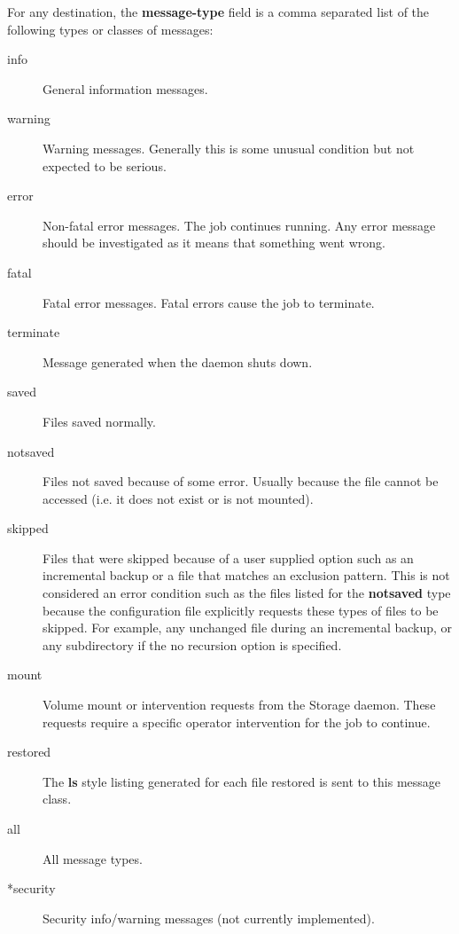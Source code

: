 \begin{description}
For any destination, the {\bf message-type} field is a comma  separated list
of the following types or classes of messages:  

\begin{description}

\item [info]
   General information messages.  

\item [warning]
   Warning messages. Generally this is some  unusual condition but not expected
to be serious. 

\item [error]
   Non-fatal error messages. The job continues running.  Any error message should
be investigated as it means that something  went wrong.  

\item [fatal]
   Fatal error messages. Fatal errors cause the  job to terminate.  

\item [terminate]
   Message generated when the daemon shuts down.  

\item [saved]
   Files saved normally.  

\item [notsaved]
   Files not saved because of some error.  Usually because the file cannot be
accessed (i.e. it does not  exist or is not mounted).  

\item [skipped]
   Files that were skipped because of a user  supplied option such as an
incremental backup or a file that  matches an exclusion pattern. This is not
considered an  error condition such as the files listed for the  {\bf
notsaved} type because the configuration file  explicitly requests these types
of files to be skipped. For  example, any unchanged file during an incremental
backup, or  any subdirectory if the no recursion option is  specified.  

\item [mount]
   Volume mount or intervention requests from the  Storage daemon. These requests
require a specific operator  intervention for the job to continue.  

\item [restored]
   The {\bf ls} style listing generated for each  file restored is sent to this
message class.  

\item [all]
   All message types.  

\item [*security]
   Security info/warning messages (not currently  implemented).  
\end{description}

\end{description}

